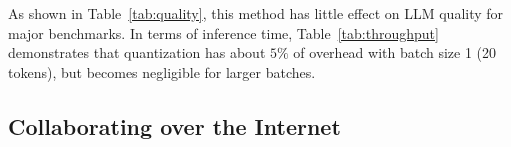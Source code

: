 
As shown in Table~\ref{tab:quality}, this method has little effect on LLM quality for major benchmarks.
In terms of inference time, Table~\ref{tab:throughput} demonstrates that quantization has about $5\%$ of overhead with batch size 1 (20 tokens), but becomes negligible for larger batches.


\subsection{Collaborating over the Internet}\label{sect:networking}

\begin{table}[tb]
\centering
\caption{Zero-shot accuracy for OPT-175B and BLOOM-176B with 8-bit and 16-bit weights.\nocite{eval-harness}}
\vspace{-5pt}
\label{tab:quality}
\end{table}

